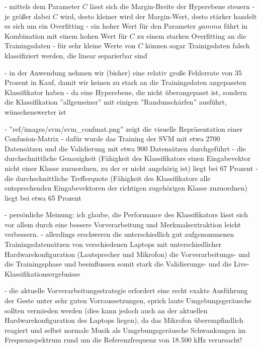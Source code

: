 - mittels dem Parameter $C$ lässt sich die Margin-Breite der Hyperebene steuern
- je größer dabei $C$ wird, desto kleiner wird der Margin-Wert, desto stärker handelt es sich um ein Overfitting
- ein hoher Wert für den Parameter $gamma$ führt in Kombination mit einem hohen Wert für $C$ zu einem starken Overfitting an die Trainingsdaten
- für sehr kleine Werte von $C$ können sogar Trainigsdaten falsch klassifiziert werden, die linear separierbar sind

- in der Anwendung nehmen wir (bisher) eine relativ große Fehlerrate von 35 Prozent in Kauf, damit wir keinen zu stark an die Trainingsdaten angepassten Klassifikator haben
- da eine Hyperebene, die nicht überangepasst ist, sondern die Klassifikation ''allgemeiner'' mit einigen ''Randunschärfen'' ausführt, wünschenswerter ist

- ''ref/images/svm/svm\_confmat.png'' zeigt die visuelle Repräsentation einer Confusion-Matrix
- dafür wurde das Training der SVM mit etwa 2700 Datensätzen und die Validierung mit etwa 900 Datensätzen durchgeführt
- die durchschnittliche Genauigkeit (Fähigkeit des Klassifikators einen Eingabevektor nicht einer Klasse zuzuordnen, zu der er nicht angehörig ist) liegt bei 67 Prozent
- die durchschnittliche Trefferquote (Fähigkeit des Klassifikators alle entsprechenden Eingabevektoren der richtigen zugehörigen Klasse zuzuordnen) liegt bei etwa 65 Prozent

- persönliche Meinung: ich glaube, die Performance des Klassifikators lässt sich vor allem durch eine bessere Vorverarbeitung und Merkmalsextraktion leicht verbessern.
- allerdings erschweren die unterschiedlich gut aufgenommenen Trainingsdatensätzen von verschiedenen Laptops mit unterschiedlicher Hardwarekonfiguration (Lautsprecher und Mikrofon) die Vorverarbeitungs- und die Trainingsphase und beeinflussen somit stark die Validierungs- und die Live-Klassifikationsergebnisse

- die aktuelle Vorverarbeitungsstrategie erfordert eine recht exakte Ausführung der Geste unter sehr guten Vorraussetzungen, sprich laute Umgebungsgeräusche sollten vermieden werden (dies kann jedoch auch an der aktuellen Hardwarekonfiguration des Laptops liegen), da das Mikrofon überempfindlich reagiert und selbst normale Musik als Umgebungsgeräusche Schwankungen im Frequenzspektrum rund um die Referenzfrequenz von 18.500 kHz verursacht!
